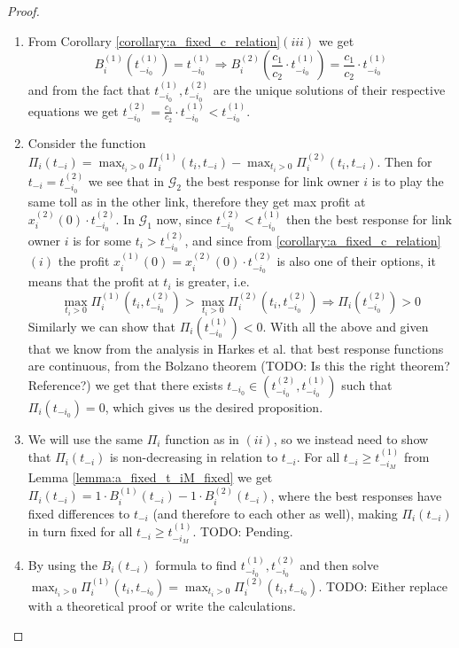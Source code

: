\documentclass[10pt,a4paper]{book}
\newcommand{\Gm}{\mathcal{G}}
\theoremstyle{definition}
\theoremstyle{comment}
\begin{document}
\begin{proof}
	$ $
	\begin{enumerate}[$(i)$]
		\item From Corollary \ref{corollary:a_fixed_c_relation}$(iii)$ we get
		\[
			B_i^{(1)}(t_{-i_0}^{(1)}) = t_{-i_0}^{(1)} \Rightarrow B_i^{(2)}\left(\frac{c_1}{c_2} \cdot t_{-i_0}^{(1)}\right) = \frac{c_1}{c_2} \cdot t_{-i_0}^{(1)}
		\]
		and from the fact that $t_{-i_0}^{(1)}, t_{-i_0}^{(2)}$ are the unique solutions of their respective equations we get $t_{-i_0}^{(2)} = \frac{c_1}{c_2} \cdot t_{-i_0}^{(1)} < t_{-i_0}^{(1)}$.
		\item Consider the function $\Pi_i(t_{-i}) = \max_{t_i > 0}\Pi_i^{(1)}(t_i, t_{-i}) - \max_{t_i > 0}\Pi_i^{(2)}(t_i, t_{-i})$.
		Then for $t_{-i} = t_{-i_0}^{(2)}$ we see that in $\Gm_2$ the best response for link owner $i$ is to play the same toll as in the other link, therefore they get max profit at $x_i^{(2)}(0) \cdot t_{-i_0}^{(2)}$.
		In $\Gm_1$ now, since $t_{-i_0}^{(2)} < t_{-i_0}^{(1)}$ then the best response for link owner $i$ is for some $t_i > t_{-i_0}^{(2)}$, and since from \ref{corollary:a_fixed_c_relation}$(i)$ the profit $x_i^{(1)}(0) = x_i^{(2)}(0) \cdot t_{-i_0}^{(2)}$ is also one of their options, it means that the profit at $t_i$ is greater, i.e.
		\[
			\max_{t_i > 0}\Pi_i^{(1)}(t_i, t_{-i_0}^{(2)}) > \max_{t_i > 0}\Pi_i^{(2)}(t_i, t_{-i_0}^{(2)}) \Rightarrow \Pi_i(t_{-i_0}^{(2)}) > 0
		\]
		Similarly we can show that $\Pi_i(t_{-i_0}^{(1)}) < 0$.
		With all the above and given that we know from the analysis in Harkes et al. \cite{Harks_2019} that best response functions are continuous, from the Bolzano theorem (TODO: Is this the right theorem? Reference?) we get that there exists $t_{-i_0} \in \left(t_{-i_0}^{(2)}, t_{-i_0}^{(1)}\right)$ such that $\Pi_i(t_{-i_0}) = 0$, which gives us the desired proposition.
		\item We will use the same $\Pi_i$ function as in $(ii)$, so we instead need to show that $\Pi_i(t_{-i})$ is non-decreasing in relation to $t_{-i}$.
		For all $t_{-i} \ge t_{-i_M}^{(1)}$ from Lemma \ref{lemma:a_fixed_t_iM_fixed} we get $\Pi_i(t_{-i}) = 1 \cdot B_i^{(1)}(t_{-i}) - 1 \cdot B_i^{(2)}(t_{-i})$, where the best responses have fixed differences to $t_{-i}$ (and therefore to each other as well), making $\Pi_i(t_{-i})$ in turn fixed for all $t_{-i} \ge t_{-i_M}^{(1)}$.
		TODO: Pending.
		\item By using the $B_i(t_{-i})$ formula to find $t_{-i_0}^{(1)}, t_{-i_0}^{(2)}$ and then solve $\max_{t_i > 0}\Pi_i^{(1)}(t_i, t_{-i_0}) = \max_{t_i > 0}\Pi_i^{(2)}(t_i, t_{-i_0})$.
		TODO: Either replace with a theoretical proof or write the calculations.
	\end{enumerate}
\end{proof}
\end{document}

